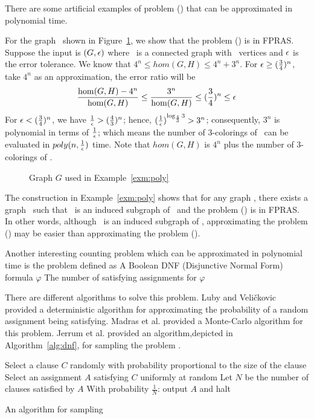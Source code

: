 There are some artificial examples of problem \ccsp(\mrelset) that can be approximated 
in polynomial time. 

\begin{example} \label{exm:poly}
For the graph \mH\ shown in Figure~\ref{fig:approxible},
we show that the problem \chom(\mH) is in FPRAS\@. Suppose the input is 
\((G,\epsilon)\) where \mG\ is a connected graph with \mn\ vertices and \(\epsilon\)
is the error tolerance.
We know that 
\(4^n\le hom(G,H) \le 4^n+3^n\)\@.
For \(\epsilon \ge (\frac{3}{4})^n\), take \(4^n\) as an approximation, the error ratio will  be
\[\frac{\hom(G,H)-4^n}{\hom(G,H)} \le \frac{3^n}{\hom(G,H)} \le (\frac{3}{4})^n \le \epsilon\]
For \(\epsilon < (\frac{3}{4})^n\), we have \(\frac{1}{\epsilon}>(\frac{4}{3})^n \);
hence, \((\frac{1}{\epsilon})^{\log_{\frac{4}{3}}3} > 3^n\); consequently, \(3^n\) is polynomial 
in terms of \(\frac{1}{\epsilon}\); which means the number of 3-colorings of \mG\ can be evaluated in 
\(poly(n,\frac{1}{\epsilon})\) time. 
Note that \(hom(G,H)\) is \(4^n\) plus the number of 3-colorings of \mG\@.

\begin{figure}[h] 
\center
\caption{Graph \ensuremath{G} used in Example~\ref{exm:poly}}
\label{fig:approxible}
\end{figure}
\end{example}

The construction in Example~\ref{exm:poly} shows that for any graph \mG,
there exists a graph \mH\ such that \mG\
is an induced subgraph of \mH\ and the problem \chom(\mH) is in FPRAS\@.
In other words, although \mG\ is an induced subgraph of \mH, approximating
the problem \chom(\mH)
may be easier than approximating the problem \chom(\mG)\@.

Another interesting counting problem which can be approximated in polynomial time is 
the problem \pname{\#DNF-SAT} defined as
\pnndef %
{A Boolean DNF (Disjunctive Normal Form) formula \(\varphi\)}
{The number of satisfying assignments for \(\varphi\)}

There are different algorithms to solve this problem.
Luby and Veli\v{c}kovic \cite{Luby} provided a deterministic algorithm for
approximating the probability of a random assignment being satisfying. 
Madras et al. \cite{Madras} provided a Monte-Carlo algorithm
for this problem. Jerrum et al. \cite{JVV} provided an algorithm,depicted in Algorithm~\ref{alg:dnf},
for sampling the problem \pname{DNF-SAT}. 
\begin{algorithm}[h]
\begin{algorithmic}
       \STATE Select a clause \(C\) randomly with probability proportional to the size of the clause
       \STATE Select an assignment \(A\) satisfying \(C\) uniformly at random
       \STATE Let \(N\) be the number of clauses satisfied by \(A\)
       \STATE With probability \(\frac{1}{N}\): output \(A\) and halt
\ENDWHILE
\end{algorithmic}
\caption{An algorithm for sampling }\label{alg:dnf}
\end{algorithm}

